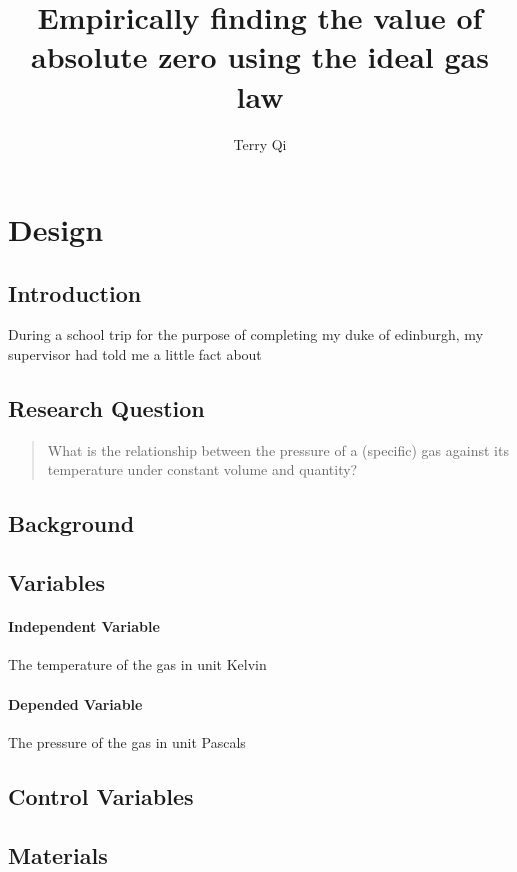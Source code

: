 \documentclass[a4paper,12pt]{article}
\title{Empirically finding the value of absolute zero using the ideal gas law}
\author{Terry Qi}
\begin{document}
\maketitle

\section{Design}
\subsection{Introduction}
During a school trip for the purpose of completing my duke of edinburgh, my supervisor had told me a little fact about    


\subsection{Research Question}
\begin{quote}
    What is the relationship between the pressure of a (specific) gas against its temperature under constant volume and quantity?
\end{quote}

\subsection{Background}



\subsection{Variables}
\paragraph{Independent Variable}
The temperature of the gas in unit Kelvin

\paragraph{Depended Variable}
The pressure of the gas in unit Pascals

\subsection{Control Variables}


\subsection{Materials}
\end{document}
